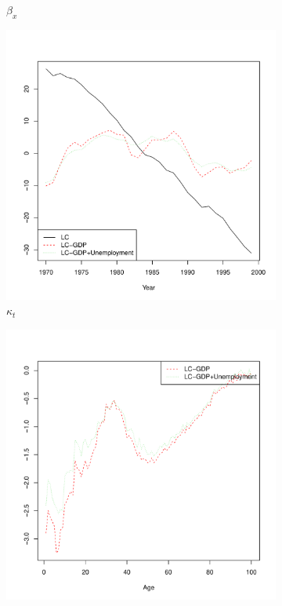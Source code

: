 \documentclass[AER, draftmode]{AEA}
\begin{document}
\begin{figure}[!htp]
\begin{subfigure}{0.4\textwidth}
		\caption{$\beta_x$}  
		\label{fig:maleb}
	\end{subfigure}
	\begin{subfigure}{0.4\textwidth}
		\includegraphics[width=\linewidth]{CAN_kt_male}
		\caption{$\kappa_t$}
		\label{fig:malec} 
	\end{subfigure}
	\begin{subfigure}{0.4\textwidth}
		\includegraphics[width=\linewidth]{CAN_g1x_male}

\end{subfigure}
\end{figure}
\end{document}
